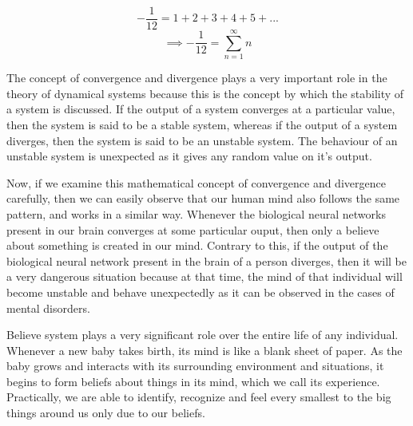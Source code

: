 \[-\dfrac{1}{12} = 1 + 2 + 3 + 4 + 5 + ...\]
\begin{equation}\label{eq:2}
	\implies\boxed{-\dfrac{1}{12} = \sum\limits_{n = 1}^\infty n}
\end{equation}

The concept of convergence and divergence plays a very important role in the theory of dynamical systems because this is the concept by which the stability of a system is discussed. If the output of a system converges at a particular value, then the system is said to be a stable system, whereas if the output of a system diverges, then the system is said to be an unstable system. The behaviour of an unstable system is unexpected as it gives any random value on it's output.

Now, if we examine this mathematical concept of convergence and divergence carefully, then we can easily observe that our human mind also follows the same pattern, and works in a similar way. Whenever the biological neural networks present in our brain converges at some particular ouput, then only a believe about something is created in our mind. Contrary to this, if the output of the biological neural network present in the brain of a person diverges, then it will be a very dangerous situation because at that time, the mind of that individual will become unstable and behave unexpectedly as it can be observed in the cases of mental disorders.

Believe system plays a very significant role over the entire life of any individual. Whenever a new baby takes birth, its mind is like a blank sheet of paper. As the baby grows and interacts with its surrounding environment and situations, it begins to form beliefs about things in its mind, which we call its experience. Practically, we are able to identify, recognize and feel every smallest to the big things around us only due to our beliefs.